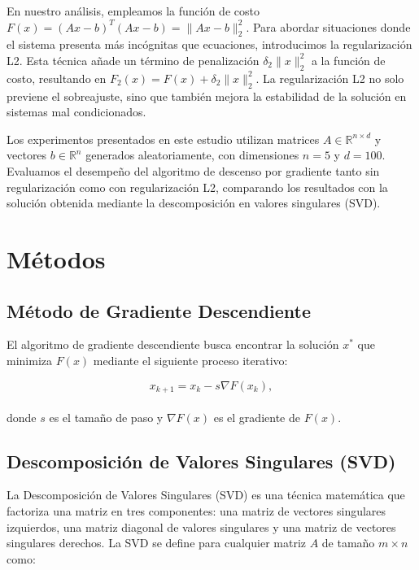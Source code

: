 \documentclass[12pt,a4]{article} %
\begin{document}
En nuestro análisis, empleamos la función de costo $F(x) = (Ax - b)^T(Ax - b)= \|Ax -b\|_2^2$. Para abordar situaciones donde el sistema presenta más incógnitas que ecuaciones, introducimos la regularización L2. Esta técnica añade un término de penalización $\delta_2\|x\|_2^2$ a la función de costo, resultando en $F_2(x) = F(x) + \delta_2\|x\|_2^2$. La regularización L2 no solo previene el sobreajuste, sino que también mejora la estabilidad de la solución en sistemas mal condicionados.

Los experimentos presentados en este estudio utilizan matrices $A \in \mathbb{R}^{n \times d}$ y vectores $b \in \mathbb{R}^n$ generados aleatoriamente, con dimensiones $n = 5$ y $d = 100$. Evaluamos el desempeño del algoritmo de descenso por gradiente tanto sin regularización como con regularización L2, comparando los resultados con la solución obtenida mediante la descomposición en valores singulares (SVD).




\section{Métodos}
\subsection{Método de Gradiente Descendiente}

El algoritmo de gradiente descendiente busca encontrar la solución \(x^*\) que minimiza \(F(x)\) mediante el siguiente proceso iterativo:

\begin{equation}
x_{k+1} = x_k - s \nabla F(x_k),
\label{eq:gradiente_descendiente}
\end{equation}
\\
donde \(s\) es el tamaño de paso y \(\nabla F(x)\) es el gradiente de \(F(x)\).

\subsection{Descomposición de Valores Singulares (SVD)}

La Descomposición de Valores Singulares (SVD) es una técnica matemática que factoriza una matriz en tres componentes: una matriz de vectores singulares izquierdos, una matriz diagonal de valores singulares y una matriz de vectores singulares derechos. La SVD se define para cualquier matriz \(A\) de tamaño \(m \times n\) como:
\end{document}
